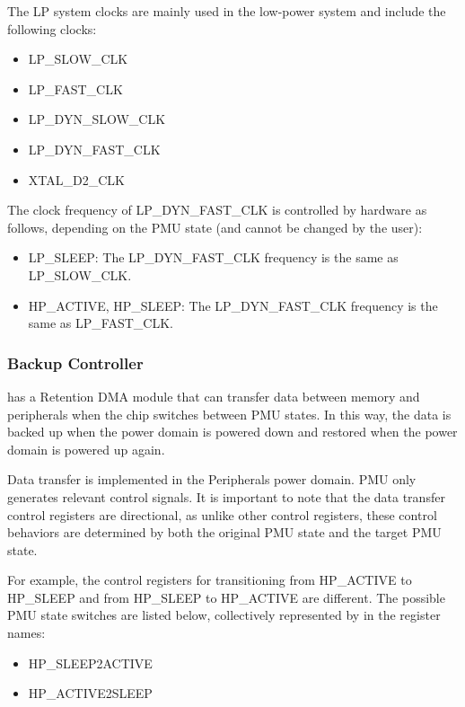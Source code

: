 \documentclass[main\_\_EN.tex]{subfiles}
\begin{document}
The LP system clocks are mainly used in the low-power system and include the following clocks:

\begin{itemize}
\item LP\_SLOW\_CLK
\item LP\_FAST\_CLK
\item LP\_DYN\_SLOW\_CLK
\item LP\_DYN\_FAST\_CLK
\item XTAL\_D2\_CLK
\end{itemize}

The clock frequency of LP\_DYN\_FAST\_CLK is controlled by hardware as follows, depending on the PMU state (and cannot be changed by the user):

\begin{itemize}
\item LP\_SLEEP: The LP\_DYN\_FAST\_CLK frequency is the same as LP\_SLOW\_CLK.
\item HP\_ACTIVE, HP\_SLEEP: The LP\_DYN\_FAST\_CLK frequency is the same as LP\_FAST\_CLK.
\end{itemize}

\subsubsection{Backup Controller}

\chipname{} has a Retention DMA module that can transfer data between memory and peripherals when the chip switches between PMU states. In this way, the data is backed up when the power domain is powered down and restored when the power domain is powered up again.

Data transfer is implemented in the Peripherals power domain. PMU only generates relevant control signals. It is important to note that the data transfer control registers are directional, as unlike other control registers, these control behaviors are determined by both the original PMU state and the target PMU state.

For example, the control registers for transitioning from HP\_ACTIVE to HP\_SLEEP and from HP\_SLEEP to HP\_ACTIVE are different. The possible PMU state switches are listed below, collectively represented by  in the register names:

\begin{itemize}
\item HP\_SLEEP2ACTIVE
\item HP\_ACTIVE2SLEEP
\end{itemize}
\end{document}
